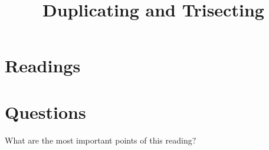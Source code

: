 \documentclass{ximera}
\title{Duplicating and Trisecting}
\begin{document}
\begin{abstract}
\end{abstract}
\maketitle






\section{Readings}








\section{Questions}




\begin{question}
What are the most important points of this reading?
\begin{freeResponse}
\end{freeResponse}
\end{question}
\end{document}

